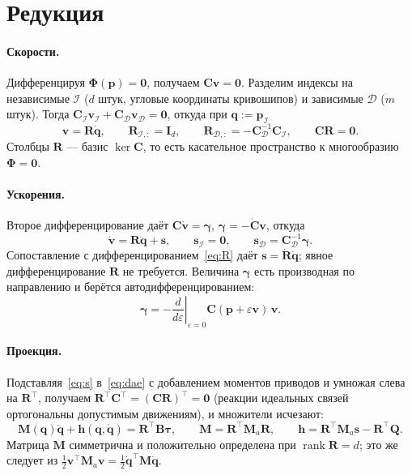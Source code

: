 \documentclass[11pt,a4paper]{article}
\newcommand{\bp}{\mathbf{p}}
\newcommand{\bq}{\mathbf{q}}
\newcommand{\bv}{\mathbf{v}}
\newcommand{\bs}{\mathbf{s}}
\newcommand{\bC}{\mathbf{C}}
\newcommand{\bR}{\mathbf{R}}
\newcommand{\bM}{\mathbf{M}}
\newcommand{\bB}{\mathbf{B}}
\newcommand{\bI}{\mathbf{I}}
\newcommand{\bQ}{\mathbf{Q}}
\newcommand{\bh}{\mathbf{h}}
\newcommand{\bzero}{\mathbf{0}}
\newcommand{\bPhi}{\boldsymbol{\Phi}}
\newcommand{\btau}{\boldsymbol{\tau}}
\newcommand{\bgam}{\boldsymbol{\gamma}}
\newcommand{\Ma}{\bM_{a}}
\newcommand{\tr}{^{\!\top}}
\begin{document}
\section{Редукция}

\paragraph{Скорости.} Дифференцируя $\bPhi(\bp)=\bzero$, получаем
$\bC\bv=\bzero$. Разделим индексы на независимые $\mathcal I$ ($d$ штук,
угловые координаты кривошипов) и зависимые $\mathcal D$ ($m$ штук). Тогда
$\bC_{\mathcal I}\bv_{\mathcal I}+\bC_{\mathcal D}\bv_{\mathcal D}=\bzero$,
откуда при $\bq:=\bp_{\mathcal I}$
\begin{equation}
\bv=\bR\dot{\bq},
\qquad
\bR_{\mathcal I,:}=\bI_d,
\qquad
\bR_{\mathcal D,:}=-\bC_{\mathcal D}^{-1}\bC_{\mathcal I},
\qquad
\bC\bR=\bzero.
\label{eq:R}
\end{equation}
Столбцы $\bR$ --- базис $\ker\bC$, то есть касательное пространство к
многообразию $\bPhi=\bzero$.

\paragraph{Ускорения.} Второе дифференцирование даёт $\bC\dot{\bv}=\bgam$,
$\bgam=-\dot{\bC}\bv$, откуда
\begin{equation}
\dot{\bv}=\bR\ddot{\bq}+\bs,
\qquad
\bs_{\mathcal I}=\bzero,
\qquad
\bs_{\mathcal D}=\bC_{\mathcal D}^{-1}\bgam.
\label{eq:s}
\end{equation}
Сопоставление с дифференцированием~\eqref{eq:R} даёт $\bs=\dot{\bR}\dot{\bq}$;
явное дифференцирование $\bR$ не требуется. Величина $\bgam$ есть производная
по направлению и берётся автодифференцированием:
\begin{equation}
\bgam=-\left.\frac{d}{d\varepsilon}\right|_{\varepsilon=0}\bC(\bp+\varepsilon\bv)\,\bv .
\end{equation}

\paragraph{Проекция.} Подставляя~\eqref{eq:s} в~\eqref{eq:dae} с добавлением
моментов приводов и умножая слева на $\bR\tr$, получаем
$\bR\tr\bC\tr=(\bC\bR)\tr=\bzero$ (реакции идеальных связей ортогональны
допустимым движениям), и множители исчезают:
\begin{equation}
\bM(\bq)\ddot{\bq}+\bh(\bq,\dot{\bq})=\bR\tr\bB\btau,
\qquad
\bM=\bR\tr\Ma\bR,
\qquad
\bh=\bR\tr\Ma\bs-\bR\tr\bQ.
\label{eq:Mh}
\end{equation}
Матрица $\bM$ симметрична и положительно определена при
$\operatorname{rank}\bR=d$; это же следует из
$\tfrac12\bv\tr\Ma\bv=\tfrac12\dot{\bq}\tr\bM\dot{\bq}$.
\end{document}
